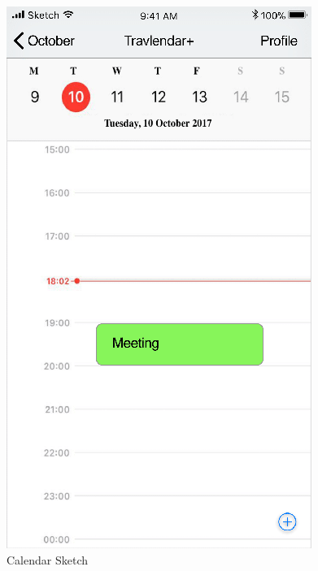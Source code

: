 \begin{figure}[H]
	\hspace{0.5cm}
	\includegraphics[scale=0.23]{Images/Interface/Calendar/4_calendar+meeting}
	\caption{Calendar Sketch}
\end{figure}

